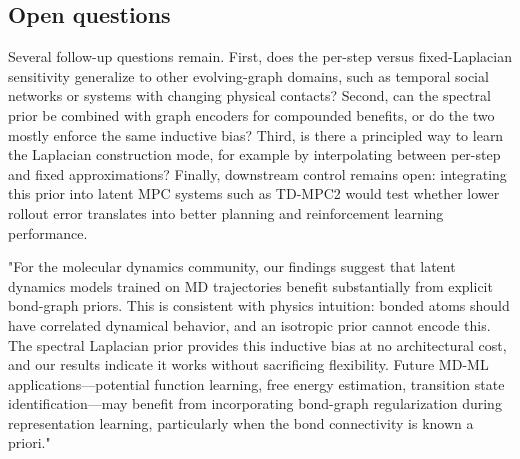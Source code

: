 \subsection{Open questions}\label{sec:open_questions}

Several follow-up questions remain. First, does the per-step versus fixed-Laplacian sensitivity generalize to other evolving-graph domains, such as temporal social networks or systems with changing physical contacts? Second, can the spectral prior be combined with graph encoders for compounded benefits, or do the two mostly enforce the same inductive bias? Third, is there a principled way to learn the Laplacian construction mode, for example by interpolating between per-step and fixed approximations? Finally, downstream control remains open: integrating this prior into latent MPC systems such as TD-MPC2 \cite{tdmpc2} would test whether lower rollout error translates into better planning and reinforcement learning performance.

"For the molecular dynamics community, our findings suggest that latent dynamics 
models trained on MD trajectories benefit substantially from explicit bond-graph 
priors. This is consistent with physics intuition: bonded atoms should have 
correlated dynamical behavior, and an isotropic prior cannot encode this. The 
spectral Laplacian prior provides this inductive bias at no architectural cost, 
and our results indicate it works without sacrificing flexibility. Future MD-ML 
applications—potential function learning, free energy estimation, transition 
state identification—may benefit from incorporating bond-graph regularization 
during representation learning, particularly when the bond connectivity is 
known a priori."
